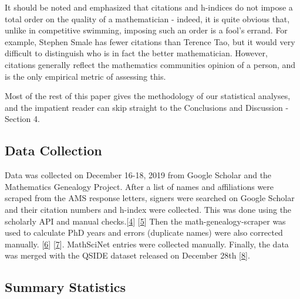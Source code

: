 \documentclass[]{article}
\begin{document}
It should be noted and emphasized that citations and h-indices do not
impose a total order on the quality of a mathematician - indeed, it is
quite obvious that, unlike in competitive swimming, imposing such an
order is a fool's errand. For example, Stephen Smale has fewer citations
than Terence Tao, but it would very difficult to distinguish who is in
fact the better mathematician. However, citations generally reflect the
mathematics communities opinion of a person, and is the only empirical
metric of assessing this.

Most of the rest of this paper gives the methodology of our statistical
analyses, and the impatient reader can skip straight to the Conclusions
and Discussion - Section 4.

\hypertarget{data-collection}{%
\subsection{Data Collection}\label{data-collection}}

Data was collected on December 16-18, 2019 from Google Scholar and the
Mathematics Genealogy Project. After a list of names and affiliations
were scraped from the AMS response letters, signers were searched on
Google Scholar and their citation numbers and h-index were collected.
This was done using the scholarly API and manual
checks.{[}\protect\hyperlink{Bibliography}{4}{]}
{[}\protect\hyperlink{Bibliography}{5}{]} Then the
math-genealogy-scraper was used to calculate PhD years and errors
(duplicate names) were also corrected manually.
{[}\protect\hyperlink{Bibliography}{6}{]}
{[}\protect\hyperlink{Bibliography}{7}{]}. MathSciNet entries were
collected manually. Finally, the data was merged with the QSIDE dataset
released on December 28th {[}\protect\hyperlink{Bibliography}{8}{]}.

\hypertarget{summary-statistics}{%
\subsection{Summary Statistics}\label{summary-statistics}}
\end{document}

